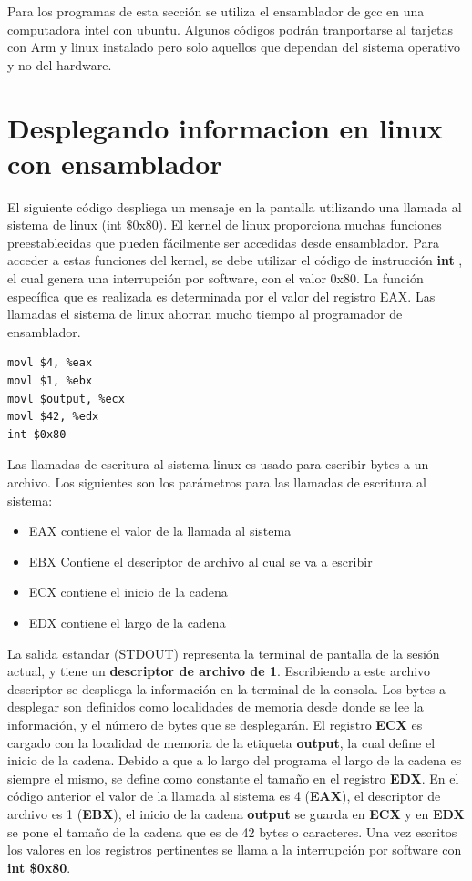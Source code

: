 \documentclass[12pt, twoside]{report}
\begin{document}
Para los programas de esta sección se utiliza el ensamblador de gcc en una computadora intel con ubuntu. Algunos códigos podrán tranportarse al tarjetas con Arm y linux instalado pero solo aquellos que dependan del sistema operativo y no del hardware.

\section{Desplegando informacion en linux con ensamblador}

El siguiente código despliega un mensaje en la pantalla utilizando una llamada al sistema de linux (int \$0x80). El kernel de linux proporciona muchas funciones preestablecidas que pueden fácilmente ser accedidas desde ensamblador. Para acceder a estas funciones del kernel, se debe utilizar el código de instrucción \textbf{int} , el cual genera una interrupción por software, con el valor 0x80. La función específica que es realizada es determinada por el valor del registro EAX. Las llamadas el sistema de linux ahorran mucho tiempo al programador de ensamblador.

\begin{lstlisting}[language={[x86masm]Assembler}]
movl $4, %eax
movl $1, %ebx
movl $output, %ecx
movl $42, %edx
int $0x80
\end{lstlisting}

Las llamadas de escritura al sistema linux es usado para escribir bytes a un archivo. Los siguientes son los parámetros para las llamadas de escritura al sistema:

\begin{itemize}
\item EAX contiene el valor de la llamada al sistema
\item EBX Contiene el descriptor de archivo al cual se va a escribir
\item ECX contiene el inicio de la cadena
\item EDX contiene el largo de la cadena
\end{itemize}

La salida estandar (STDOUT) representa la terminal de  pantalla de la sesión actual, y tiene un \textbf{descriptor de archivo de 1}. Escribiendo a este archivo descriptor se despliega la información en la terminal de la consola.
Los bytes a desplegar son definidos como localidades de memoria desde donde se lee la información, y el número de bytes que se desplegarán. El registro \textbf{ECX} es cargado con la localidad de memoria de la etiqueta \textbf{output}, la cual define el inicio de la cadena. Debido a que a lo largo del programa el largo de la cadena es siempre el mismo, se define como constante el tamaño en el registro \textbf{EDX}. En el código anterior el valor de la llamada al sistema es 4 (\textbf{EAX}), el descriptor de archivo es 1 (\textbf{EBX}), el inicio de la cadena \textbf{output} se guarda en \textbf{ECX} y en \textbf{EDX} se pone el tamaño de la cadena que es de 42 bytes o caracteres. Una vez escritos los valores en los registros pertinentes se llama a la interrupción por software con \textbf{int \$0x80}.
\end{document}
